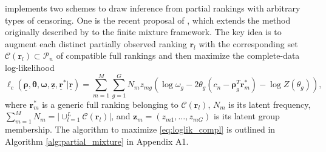  implements two schemes to draw inference from partial rankings with arbitrary types of censoring. One is the recent proposal of \cite{crispino23efficient}, which extends the method originally described by \cite{beckett93maximum} to the finite mixture framework. %
The key idea is to augment each distinct partially observed ranking $\bm{r}_l$ with the corresponding set $\mathcal{C}(\bm r_l)\subset \mathcal{P}_n$ of compatible full rankings and then maximize the complete-data log-likelihood
%
\begin{equation}
\label{eq:loglik_compl}
\ell_c(\underline{\bm{\rho}},{\bm{\theta}},{\bm{\omega}},\underline{\bm{z}},\underline{\bm{r}}^*\vert\underline{\bm r})
=\sum_{m=1}^M\sum_{g=1}^GN_mz_{mg}\left(\log\omega_g-2\theta_g\left(c_n-{\bm{\rho}^T_g}\bm{r}^*_m\right)-\log Z(\theta_g)\right),
\end{equation}
where $\bm{r}^*_m$ is a generic full ranking belonging to $\mathcal{C}(\bm r_l)$, $N_m$ is its latent frequency, $\sum_{m=1}^MN_m=\vert\cup_{l=1}^L\mathcal{C}(\bm r_l)\vert$, and $\bm z_m = (z_{m1},\dots, z_{mG})$ is its latent group membership.
The algorithm to maximize \eqref{eq:loglik_compl} is outlined in Algorithm \ref{alg:partial_mixture} in Appendix A1.

